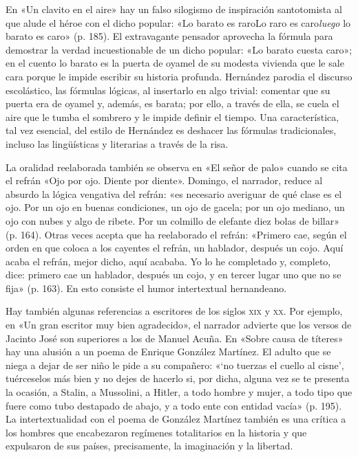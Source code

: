 \documentclass[14pt,twoside,final]{extbook} %
\begin{document}
En «Un clavito en el aire» hay un falso silogismo de inspiración santotomista al que alude el héroe con el dicho popular: «Lo barato es raro Lo raro es caro\emph{luego} lo barato es caro» (p. 185). El extravagante pensador aprovecha la fórmula para demostrar la verdad incuestionable de un dicho popular: «Lo barato cuesta caro»; en el cuento lo barato es la puerta de oyamel de su modesta vivienda que le sale cara porque le impide escribir su historia profunda. Hernández parodia el discurso escolástico, las fórmulas lógicas, al insertarlo en algo trivial: comentar que su puerta era de oyamel y, además, es barata; por ello, a través de ella, se cuela el aire que le tumba el sombrero y le impide definir el tiempo. Una característica, tal vez esencial, del estilo de Hernández es deshacer las fórmulas tradicionales, incluso las lingüísticas y literarias a través de la risa.

La oralidad reelaborada también se observa en «El señor de palo» cuando se cita el refrán «Ojo por ojo. Diente por diente». Domingo, el narrador, reduce al absurdo la lógica vengativa del refrán: «es necesario averiguar de qué clase es el ojo. Por un ojo en buenas condiciones, un ojo de gacela; por un ojo mediano, un ojo con nubes y algo de ribete. Por un colmillo de elefante diez bolas de billar» (p. 164). Otras veces acepta que ha reelaborado el refrán: «Primero cae, según el orden en que coloca a los cayentes el refrán, un hablador, después un cojo. Aquí acaba el refrán, mejor dicho, aquí acababa. Yo lo he completado y, completo, dice: primero cae un hablador, después un cojo, y en tercer lugar uno que no se fija» (p. 163). En esto consiste el humor intertextual hernandeano.

Hay también algunas referencias a escritores de los siglos \textsc{xix} y \textsc{xx}. Por ejemplo, en «Un gran escritor muy bien agradecido», el narrador advierte que los versos de Jacinto José son superiores a los de Manuel Acuña. En «Sobre causa de títeres» hay una alusión a un poema de Enrique González Martínez. El adulto que se niega a dejar de ser niño le pide a su compañero: «`no tuerzas el cuello al cisne', tuérceselos más bien y no dejes de hacerlo si, por dicha, alguna vez se te presenta la ocasión, a Stalin, a Mussolini, a Hitler, a todo hombre y mujer, a todo tipo que fuere como tubo destapado de abajo, y a todo ente con entidad vacía» (p. 195). La intertextualidad con el poema de González Martínez también es una crítica a los hombres que encabezaron regímenes totalitarios en la historia y que expulsaron de sus países, precisamente, la imaginación y la libertad.
\end{document}
